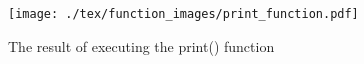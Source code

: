 \begin{figure}[H]
    \texttt{[image: ./tex/function\_images/print\_function.pdf]}
    \caption{The result of executing the print() function} \label{fig:print_function_result}
\end{figure}
